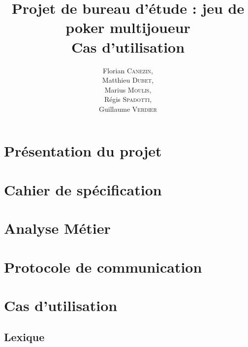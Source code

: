 \documentclass[a4paper]{report}
\title{Projet de bureau d'étude : jeu de poker multijoueur\\Cas d'utilisation}
\author{
	Florian \textsc{Canezin},\\
	Matthieu \textsc{Dubet},\\
	Marius \textsc{Moulis},\\
	Régis \textsc{Spadotti},\\
	Guillaume \textsc{Verdier}
}
\date{}
\begin{document}
	\maketitle
	\clearpage

	\dominitoc
	\tableofcontents
	
	\chapter{Présentation du projet}
	
	
	\chapter{Cahier de spécification}
	
	
	\chapter{Analyse Métier}
	
	
	
	\chapter{Protocole de communication}
	
	
	\chapter{Cas d'utilisation}
	
	
	\begin{appendices}
		\chapter{Lexique}
		
	\end{appendices}
	
\end{document}
